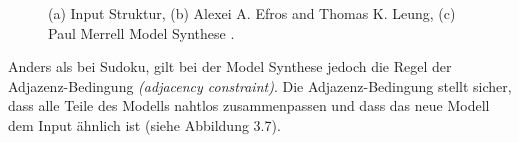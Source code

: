 \documentclass[12pt, a4paper,twoside,openany]{report} %
\begin{document}
\begin{figure}[H]
    \centering
    \qquad
    \qquad
    \caption{(a) Input Struktur, (b) Alexei A. Efros and Thomas K. Leung, (c) Paul Merrell Model Synthese \cite{merrell2009model}.}%
\end{figure}

Anders als bei Sudoku, gilt bei der Model Synthese jedoch die Regel der Adjazenz-Bedingung \textit{(adjacency constraint)}.
Die Adjazenz-Bedingung stellt sicher, dass alle Teile des Modells nahtlos zusammenpassen und dass das neue Modell dem Input ähnlich ist {(siehe Abbildung 3.7)}.
\end{document}
